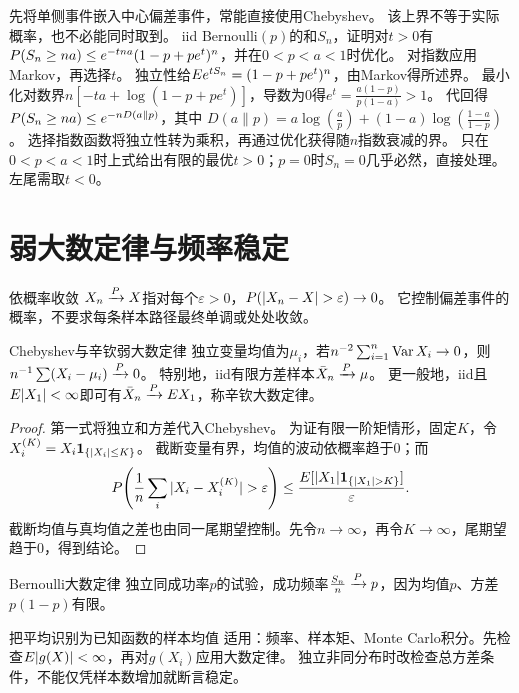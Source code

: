 {先将单侧事件嵌入中心偏差事件，常能直接使用Chebyshev。}
{该上界不等于实际概率，也不必能同时取到。}
{iid Bernoulli$(p)$的和$S_n$，证明对$t>0$有$P(S_n\ge na)\le e^{-tna}(1-p+pe^t)^n$，并在$0<p<a<1$时优化。}
{对指数应用Markov，再选择$t$。}
{独立性给$E e^{tS_n}=(1-p+pe^t)^n$，由Markov得所述界。
最小化对数界$n[-ta+\log(1-p+pe^t)]$，导数为0得$e^t=\frac{a(1-p)}{p(1-a)}>1$。
代回得$P(S_n\ge na)\le e^{-nD(a\|p)}$，其中
$D(a\|p)=a\log(\frac{a}{p})+(1-a)\log(\frac{1-a}{1-p})$。}
{选择指数函数将独立性转为乘积，再通过优化获得随$n$指数衰减的界。}
{只在$0<p<a<1$时上式给出有限的最优$t>0$；$p=0$时$S_n=0$几乎必然，直接处理。左尾需取$t<0$。}

\section{弱大数定律与频率稳定}\label{sec:52}
\begin{definition}{依概率收敛}
$X_n\xrightarrow{P} X$指对每个$\varepsilon>0$，$\Pp(|X_n-X|>\varepsilon)\to0$。
它控制偏差事件的概率，不要求每条样本路径最终单调或处处收敛。
\end{definition}
\begin{theorem}{Chebyshev与辛钦弱大数定律}
独立变量均值为$\mu_i$，若$n^{-2}\sum_{i=1}^n\operatorname{Var} X_i\to0$，则$n^{-1}\sum(X_i-\mu_i)\xrightarrow{P}0$。
特别地，iid有限方差样本$\bar X_n\xrightarrow{P}\mu$。
更一般地，iid且$E|X_1|<\infty$即可有$\bar X_n\xrightarrow{P}E X_1$，称辛钦大数定律。
\end{theorem}
\begin{proof}
第一式将独立和方差代入Chebyshev。
为证有限一阶矩情形，固定$K$，令$X_i^{(K)}=X_i\mathbf1_{\{|X_i|\le K\}}$。
截断变量有界，均值的波动依概率趋于0；而
\[\Pp\!\left(\dfrac1n\sum_i|X_i-X_i^{(K)}|>\varepsilon\right)
\le\dfrac{\E[|X_1|\ind_{\{|X_1|>K\}}]}{\varepsilon}.
\]
截断均值与真均值之差也由同一尾期望控制。先令$n\to\infty$，再令$K\to\infty$，尾期望趋于0，得到结论。
\end{proof}
\begin{corollary}{Bernoulli大数定律}
独立同成功率$p$的试验，成功频率$\frac{S_n}{n}\xrightarrow{P} p$，因为均值$p$、方差$p(1-p)$有限。
\end{corollary}
\begin{method}{把平均识别为已知函数的样本均值}
适用：频率、样本矩、Monte Carlo积分。先检查$E|g(X)|<\infty$，再对$g(X_i)$应用大数定律。
独立非同分布时改检查总方差条件，不能仅凭样本数增加就断言稳定。
\end{method}
